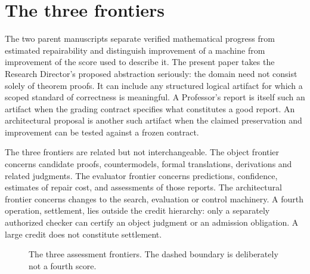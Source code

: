 \documentclass[11pt]{article}
\begin{document}
\section{The three frontiers}
The two parent manuscripts \cite{creative,professor} separate verified mathematical progress from estimated repairability and distinguish improvement of a machine from improvement of the score used to describe it. The present paper takes the Research Director's proposed abstraction seriously: the domain need not consist solely of theorem proofs. It can include any structured logical artifact for which a scoped standard of correctness is meaningful. A Professor's report is itself such an artifact when the grading contract specifies what constitutes a good report. An architectural proposal is another such artifact when the claimed preservation and improvement can be tested against a frozen contract.

The three frontiers are related but not interchangeable. The object frontier concerns candidate proofs, countermodels, formal translations, derivations and related judgments. The evaluator frontier concerns predictions, confidence, estimates of repair cost, and assessments of those reports. The architectural frontier concerns changes to the search, evaluation or control machinery. A fourth operation, settlement, lies outside the credit hierarchy: only a separately authorized checker can certify an object judgment or an admission obligation. A large credit does not constitute settlement.
\begin{figure}[ht]
\centering
{}
\caption{The three assessment frontiers. The dashed boundary is deliberately not a fourth score.}
\end{figure}
\end{document}
